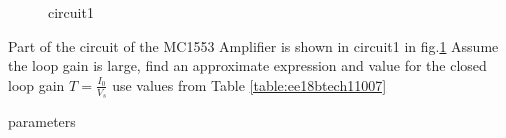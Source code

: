\begin{enumerate}[label=\thesubsection.\arabic*.,ref=\thesubsection.\theenumi]
{\small
\begin{figure}[!ht]
	\begin{center}
		
		\resizebox{\columnwidth}{!}{}
	\end{center}
\caption{circuit1}
\label{fig:circuit1}
\end{figure}
 \item Part of the circuit of the MC1553 Amplifier is shown in circuit1 in  fig.\ref{fig:circuit1} Assume the loop gain is large, find an approximate expression and value for the closed loop gain $T=\frac{I_0}{V_s}$ use values from Table
 \ref{table:ee18btech11007}
\begin{table}[!ht]
\centering

\caption{parameters}
\label{table:ee18btech11007}
\end{table}
\begin{figure}[!ht]
	\begin{center}
		

\end{center}
\end{figure}}
\end{enumerate}
